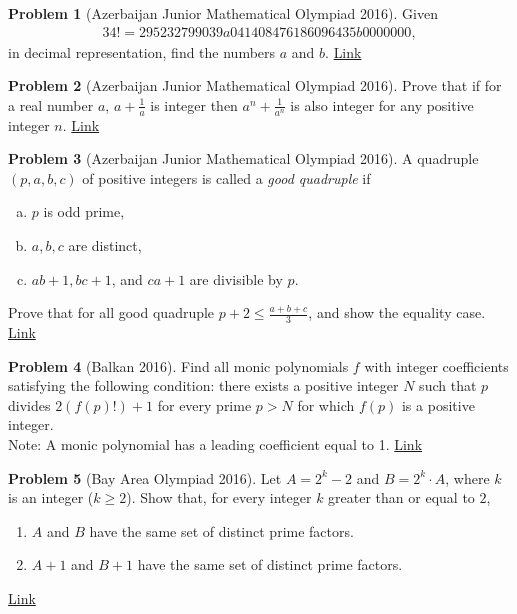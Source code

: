 \documentclass[]{article}
\theoremstyle{definition}
\newtheorem{problem}{Problem}
\begin{document}
	
\begin{problem}[Azerbaijan Junior Mathematical Olympiad 2016]
	Given  
		\begin{align*}
			34!=295232799039a041408476186096435b0000000,
		\end{align*}
	in decimal representation, find the numbers $a$ and $b$. \hfill \href{http://artofproblemsolving.com/community/c6h1195518p5852632}{Link}
\end{problem}


	
\begin{problem}[Azerbaijan Junior Mathematical Olympiad 2016]
	Prove that if for a real number $a $, $a+\frac {1}{a} $ is integer then $a^n+\frac {1}{a^n} $ is also integer for any positive integer $n$. \hfill \href{http://artofproblemsolving.com/community/c6h1195519p5852637}{Link}
\end{problem}


	
\begin{problem}[Azerbaijan Junior Mathematical Olympiad 2016]
	A quadruple $(p,a,b,c)$ of positive integers is called a \textit{good quadruple} if 
		\begin{enumerate}[(a)]
			\item $p $ is odd prime,
			\item $a,b,c $ are distinct,
			\item $ab+1,bc+1$, and $ca+1$ are divisible by $p$.
		\end{enumerate}
	Prove that for all good quadruple $p+2\le \frac {a+b+c}{3} $, and show the equality case. \flushright \href{http://artofproblemsolving.com/community/c6h1195523p5852672}{Link}
\end{problem}


	
\begin{problem}[Balkan 2016]
	Find all monic polynomials $f$ with integer coefficients satisfying the following condition: there exists a positive integer $N$ such that $p$ divides $2(f(p)!)+1$ for every prime $p>N$ for which $f(p)$ is a positive integer.
	\\
	Note: A monic polynomial has a leading coefficient equal to 1. \hfill \href{http://artofproblemsolving.com/community/c6h1239091p6316984}{Link}
\end{problem}


	
\begin{problem}[Bay Area Olympiad 2016]
	Let $A=2^k - 2$ and $B= 2^k \cdot A$, where $k$ is an integer ($k \ge 2$).
	Show that, for every integer $k$ greater than or equal to $2$,
		\begin{enumerate}
			\item $A$ and $B$ have the same set of distinct prime factors.
			\item $A+1$ and $B+1$ have the same set of distinct prime factors.
		\end{enumerate}
	\flushright \href{http://artofproblemsolving.com/community/c6h1203225p5926002}{Link}
\end{problem}
\end{document}
